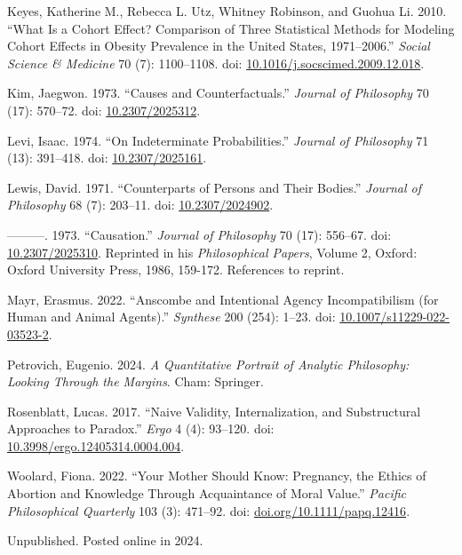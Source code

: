 \documentclass[
  10pt,
  letterpaper,
  DIV=11,
  numbers=noendperiod,
  twoside]{scrartcl}
\newlength{\cslhangindent}
\newenvironment{CSLReferences}[2] %
 {\begin{list}{}{%
  \setlength{\itemindent}{0pt}
  \setlength{\leftmargin}{0pt}
  \setlength{\parsep}{0pt}
  \ifodd #1
   \setlength{\leftmargin}{\cslhangindent}
   \setlength{\itemindent}{-1\cslhangindent}
  \fi
  \setlength{\itemsep}{#2\baselineskip}}}
 {\end{list}}
\begin{document}
\begin{CSLReferences}{1}{0}
Keyes, Katherine M., Rebecca L. Utz, Whitney Robinson, and Guohua Li.
2010. {``What Is a Cohort Effect? Comparison of Three Statistical
Methods for Modeling Cohort Effects in Obesity Prevalence in the United
States, 1971--2006.''} \emph{Social Science \& Medicine} 70 (7):
1100--1108. doi:
\href{https://doi.org/10.1016/j.socscimed.2009.12.018}{10.1016/j.socscimed.2009.12.018}.

Kim, Jaegwon. 1973. {``Causes and Counterfactuals.''} \emph{Journal of
Philosophy} 70 (17): 570--72. doi:
\href{https://doi.org/10.2307/2025312}{10.2307/2025312}.

Levi, Isaac. 1974. {``On Indeterminate Probabilities.''} \emph{Journal
of Philosophy} 71 (13): 391--418. doi:
\href{https://doi.org/10.2307/2025161}{10.2307/2025161}.

Lewis, David. 1971. {``Counterparts of Persons and Their Bodies.''}
\emph{Journal of Philosophy} 68 (7): 203--11. doi:
\href{https://doi.org/10.2307/2024902}{10.2307/2024902}.

---------. 1973. {``Causation.''} \emph{Journal of Philosophy} 70 (17):
556--67. doi: \href{https://doi.org/10.2307/2025310}{10.2307/2025310}.
Reprinted in his \emph{Philosophical Papers}, Volume 2, Oxford: Oxford
University Press, 1986, 159-172. References to reprint.

Mayr, Erasmus. 2022. {``Anscombe and Intentional Agency Incompatibilism
(for Human and Animal Agents).''} \emph{Synthese} 200 (254): 1--23. doi:
\href{https://doi.org/10.1007/s11229-022-03523-2}{10.1007/s11229-022-03523-2}.

Petrovich, Eugenio. 2024. \emph{A Quantitative Portrait of Analytic
Philosophy: Looking Through the Margins}. Cham: Springer.

Rosenblatt, Lucas. 2017. {``Naive Validity, Internalization, and
Substructural Approaches to Paradox.''} \emph{Ergo} 4 (4): 93--120. doi:
\href{https://doi.org/10.3998/ergo.12405314.0004.004}{10.3998/ergo.12405314.0004.004}.

Woolard, Fiona. 2022. {``Your Mother Should Know: Pregnancy, the Ethics
of Abortion and Knowledge Through Acquaintance of Moral Value.''}
\emph{Pacific Philosophical Quarterly} 103 (3): 471--92. doi:
\href{https://doi.org/doi.org/10.1111/papq.12416}{doi.org/10.1111/papq.12416}.

\end{CSLReferences}



\noindent Unpublished. Posted online in 2024.
\end{document}
